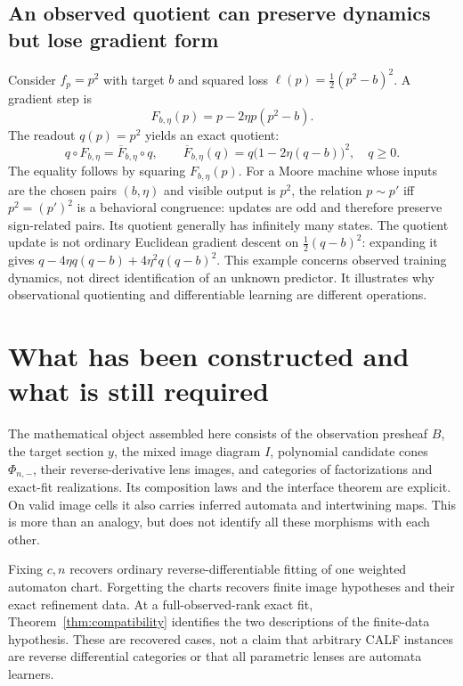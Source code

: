 \documentclass[11pt]{article}
\theoremstyle{definition}
\begin{document}
\subsection{An observed quotient can preserve dynamics but lose gradient form}

Consider $f_p=p^2$ with target $b$ and squared loss
$\ell(p)=\tfrac12(p^2-b)^2$. A gradient step is
\[
F_{b,\eta}(p)=p-2\eta p(p^2-b).
\]
The readout $q(p)=p^2$ yields an exact quotient:
\[
q\circ F_{b,\eta}=\overline F_{b,\eta}\circ q,
\qquad
\overline F_{b,\eta}(q)=q\bigl(1-2\eta(q-b)\bigr)^2,
\quad q\geq0.
\]
The equality follows by squaring $F_{b,\eta}(p)$. For a Moore machine whose
inputs are the chosen pairs $(b,\eta)$ and visible output is $p^2$, the relation
$p\sim p'$ iff $p^2=(p')^2$ is a behavioral congruence: updates are odd and
therefore preserve sign-related pairs. Its quotient generally has infinitely
many states. The quotient update is not ordinary Euclidean gradient descent
on $\tfrac12(q-b)^2$: expanding it gives
$q-4\eta q(q-b)+4\eta^2q(q-b)^2$. This example concerns observed training
dynamics, not direct identification of an unknown predictor. It illustrates
why observational quotienting and differentiable learning are different
operations.

\section{What has been constructed and what is still required}

The mathematical object assembled here consists of the observation presheaf
$B$, the target section $y$, the mixed image diagram $I$, polynomial candidate
cones $\Phi_{n,-}$, their reverse-derivative lens images, and categories of
factorizations and exact-fit realizations. Its composition laws and the
interface theorem are explicit. On valid image cells it also carries inferred
automata and intertwining maps. This is more than an analogy, but does not
identify all these morphisms with each other.

Fixing $c,n$ recovers ordinary reverse-differentiable fitting of one weighted
automaton chart. Forgetting the charts recovers finite image hypotheses and
their exact refinement data. At a full-observed-rank exact fit,
Theorem~\ref{thm:compatibility} identifies the two descriptions of the
finite-data hypothesis. These are recovered cases, not a claim that arbitrary
CALF instances are reverse differential categories or that all parametric
lenses are automata learners.
\end{document}
